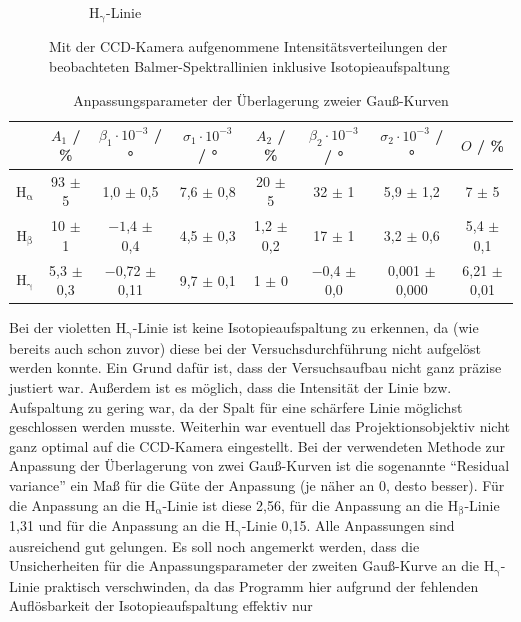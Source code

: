 \begin{figure}[H]
\begin{subfigure}{0.45\textwidth}
        \caption{$\mathrm{H_{\gamma}}$-Linie}
    \end{subfigure}
    \caption{Mit der CCD-Kamera aufgenommene Intensitätsverteilungen der beobachteten Balmer-Spektrallinien inklusive Isotopieaufspaltung}\label{fig:exp_fits}
\end{figure}
\begin{table}[H]
    \centering
    \caption{Anpassungsparameter der Überlagerung zweier Gauß-Kurven}
    \begin{tabular}{c|c|c|c|c|c|c|c}
            & $A_1$ / \% & $\beta_1 \cdot 10^{-3}$ / \unit{\degree} & $\sigma_1 \cdot 10^{-3}$ / \unit{\degree} & $A_2$ / \% & $\beta_2 \cdot 10^{-3}$ / \unit{\degree} & $\sigma_2 \cdot 10^{-3}$ / \unit{\degree} & $O$ / \% \\
        \hline
        $\mathrm{H_{\alpha}}$ & 93 $\pm$ 5 & 1,0 $\pm$ 0,5 & 7,6 $\pm$ 0,8 & 20 $\pm$ 5 & 32 $\pm$ 1 & 5,9 $\pm$ 1,2 & 7 $\pm$ 5 \\
        $\mathrm{H_{\beta}}$ & 10 $\pm$ 1 & $-1$,4 $\pm$ 0,4 & 4,5 $\pm$ 0,3 & 1,2 $\pm$ 0,2 & 17 $\pm$ 1 & 3,2 $\pm$ 0,6 & 5,4 $\pm$ 0,1 \\
        $\mathrm{H_{\gamma}}$ & 5,3 $\pm$ 0,3 & $-$0,72 $\pm$ 0,11 & 9,7 $\pm$ 0,1 & 1 $\pm$ 0 & $-$0,4 $\pm$ 0,0 & 0,001 $\pm$ 0,000 & 6,21 $\pm$ 0,01
    \end{tabular}\label{tab:exp_fits}
\end{table} Bei der violetten $\mathrm{H_{\gamma}}$-Linie ist keine Isotopieaufspaltung zu erkennen, da (wie bereits auch schon zuvor) diese bei der Versuchsdurchführung
nicht aufgelöst werden konnte. Ein Grund dafür ist, dass der Versuchsaufbau nicht ganz präzise justiert war. Außerdem ist es möglich, dass die Intensität der Linie bzw. Aufspaltung zu gering war, da
der Spalt für eine schärfere Linie möglichst geschlossen werden musste. Weiterhin war eventuell das Projektionsobjektiv nicht ganz optimal auf die CCD-Kamera eingestellt. Bei der verwendeten Methode zur Anpassung der Überlagerung von zwei Gauß-Kurven ist die sogenannte \enquote{Residual variance} ein Maß für
die Güte der Anpassung (je näher an $0$, desto besser). Für die Anpassung an die $\mathrm{H_{\alpha}}$-Linie ist diese 2,56, für die Anpassung an die $\mathrm{H_{\beta}}$-Linie 1,31
und für die Anpassung an die $\mathrm{H_{\gamma}}$-Linie 0,15. Alle Anpassungen sind ausreichend gut gelungen. Es soll noch angemerkt werden, dass die Unsicherheiten für die Anpassungsparameter
der zweiten Gauß-Kurve an die $\mathrm{H_{\gamma}}$-Linie praktisch verschwinden, da das Programm hier aufgrund der fehlenden Auflösbarkeit der Isotopieaufspaltung effektiv nur
